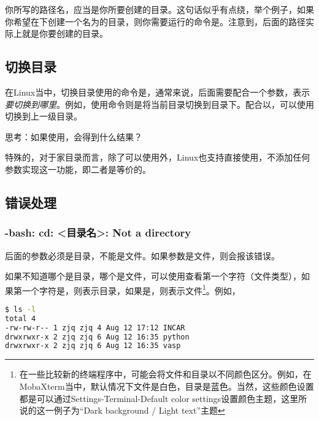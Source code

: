 \begin{attention}
    你所写的路径名，应当是你所要创建的目录。这句话似乎有点绕，举个例子，如果你希望在下创建一个名为的目录，则你需要运行的命令是。注意到，后面的路径实际上就是你要创建的目录。
\end{attention}

\subsection{切换目录}\label{subsec:目录操作-切换目录}

在Linux当中，切换目录使用的命令是，通常来说，后面需要配合一个参数，表示\emph{要切换到哪里}。例如，使用命令则是将当前目录切换到目录下。配合以，可以使用切换到上一级目录。

思考：如果使用，会得到什么结果？


特殊的，对于家目录而言，除了可以使用外，Linux也支持直接使用，不添加任何参数实现这一功能，即二者是等价的。

\subsection{错误处理}\label{subsec:目录操作-错误处理}

\subsubsection{-bash: cd: <目录名>: Not a directory}

后面的参数必须是目录，不能是文件。如果参数是文件，则会报该错误。

如果不知道哪个是目录，哪个是文件，可以使用查看第一个字符（文件类型），如果第一个字符是，则表示目录，如果是\code{-}，则表示文件\footnote{在一些比较新的终端程序中，可能会将文件和目录以不同颜色区分。例如，在MobaXterm当中，默认情况下文件是白色，目录是蓝色。当然，这些颜色设置都是可以通过Settings-Terminal-Default color settings设置颜色主题，这里所说的这一例子为“Dark background / Light text”主题}。例如，

\begin{lstlisting}[language=bash]
$ ls -l
total 4
-rw-rw-r-- 1 zjq zjq 4 Aug 12 17:12 INCAR
drwxrwxr-x 2 zjq zjq 6 Aug 12 16:35 python
drwxrwxr-x 2 zjq zjq 6 Aug 12 16:35 vasp
\end{lstlisting}

